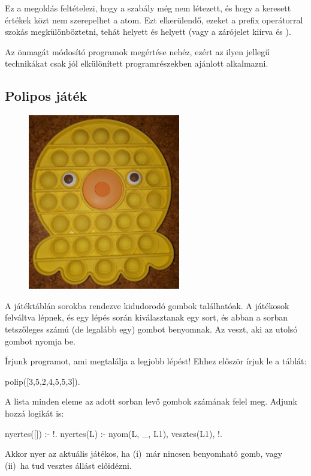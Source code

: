 Ez a megoldás feltételezi, hogy a 
szabály még nem létezett, és hogy a keresett értékek
közt nem szerepelhet a  atom. Ezt
elkerülendő, ezeket a \pr{\$} prefix operátorral
szokás megkülönböztetni, tehát 
helyett  és  helyett
 (vagy a zárójelet kiírva
 és ).

Az önmagát módosító programok megértése nehéz, ezért
az ilyen jellegű technikákat csak jól elkülönített
programrészekben ajánlott alkalmazni.

\subsection*{Polipos játék}

\begin{figure}
  \centering
  \vspace{-4em}
  \includegraphics[width=.33\textwidth]{images/polip.png}
\end{figure}
A játéktáblán sorokba rendezve kidudorodó gombok találhatóak.
A játékosok felváltva lépnek, és egy lépés során kiválasztanak egy sort,
és abban a sorban tetszőleges számú (de legalább egy) gombot benyomnak.
Az veszt, aki az utolsó gombot nyomja be.

Írjunk programot, ami megtalálja a legjobb lépést! Ehhez először írjuk le a táblát:
\begin{program}
polip([3,5,2,4,5,5,3]).
\end{program}
A lista minden eleme az adott sorban levő gombok számának felel meg.
Adjunk hozzá logikát is:
\begin{program}
nyertes([]) :- !. 
nyertes(L) :- nyom(L, _, L1), vesztes(L1), !.
\end{program}
Akkor nyer az aktuális játékos, ha (i)~már nincsen benyomható gomb, vagy
(ii)~ha tud vesztes állást előidézni.

